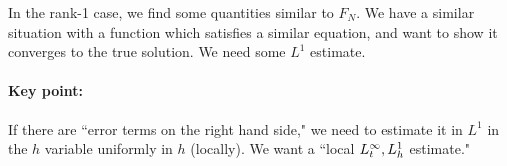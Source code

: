 In the rank-1 case, we find some quantities similar to $F_N$. We have a similar situation with a function which satisfies a similar equation, and want to show it converges to the true solution. We need some $L^1$ estimate.

\paragraph{Key point:}
If there are ``error terms on the right hand side," we need to estimate it in $L^1$ in the $h$ variable uniformly in $h$ (locally). 
We want a ``local $L_t^\infty,L_h^1$ estimate." 